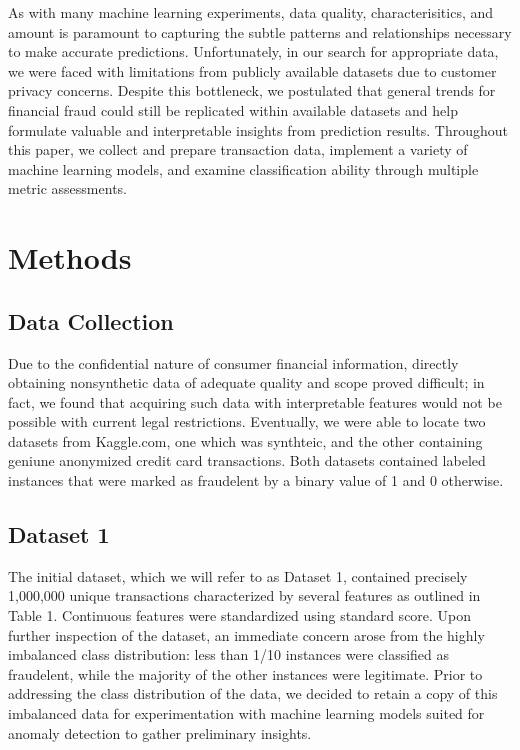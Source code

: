 \documentclass{article}
\begin{document}
As with many machine learning experiments, data quality, characterisitics, and amount is paramount to capturing the subtle patterns and relationships necessary to make accurate predictions. Unfortunately, in our search for appropriate data, we were faced with limitations from publicly available datasets due to customer privacy concerns. Despite this bottleneck, we postulated that general trends for financial fraud could still be replicated within available datasets and help formulate valuable and interpretable insights from prediction results. Throughout this paper, we collect and prepare transaction data, implement a variety of machine learning models, and examine classification ability through multiple metric assessments. 



\section{Methods}

\subsection{Data Collection}
Due to the confidential nature of consumer financial information, directly obtaining nonsynthetic data of adequate quality and scope proved difficult; in fact, we found that acquiring such data with interpretable features would not be possible with current legal restrictions. Eventually, we were able to locate two datasets from Kaggle.com, one which was synthteic, and the other containing geniune anonymized credit card transactions.  Both datasets contained labeled instances that were marked as fraudelent by a binary value of 1 and 0 otherwise. 

\subsection{Dataset 1}
The initial dataset, which we will refer to as Dataset 1, contained precisely 1,000,000 unique transactions characterized by several features as outlined in Table 1. Continuous features were standardized using standard score. Upon further inspection of the dataset, an immediate concern arose from the highly imbalanced class distribution: less than 1/10 instances were classified as fraudelent, while the majority of the other instances were legitimate. Prior to addressing the class distribution of the data, we decided to retain a copy of this imbalanced data for experimentation with machine learning models suited for anomaly detection to gather preliminary insights.
\end{document}
